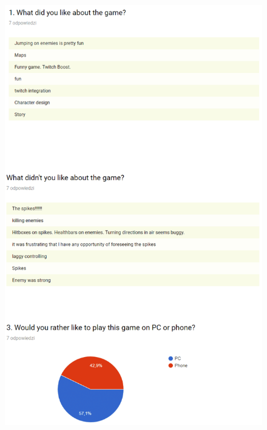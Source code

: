 \documentclass[12p]{article}
\begin{document}
\begin{figure}[ht]
  \center
  \includegraphics[width=\textwidth,height=\textheight,keepaspectratio]{surveyresults1.png}
  \label{fig:survey_results_1}
\end{figure}
\end{document}
